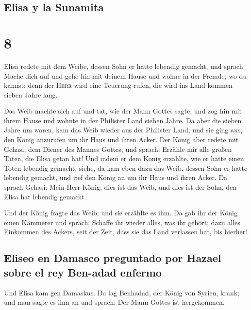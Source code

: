 \hypertarget{elisa-y-la-sunamita}{%
\subsection{Elisa y la Sunamita}\label{elisa-y-la-sunamita}}

\hypertarget{section-7}{%
\section{8}\label{section-7}}

 Elisa redete mit dem Weibe, dessen Sohn er hatte lebendig
gemacht, und sprach: Mache dich auf und gehe hin mit deinem Hause und
wohne in der Fremde, wo du kannst; denn der \textsc{Herr} wird eine
Teuerung rufen, die wird ins Land kommen sieben Jahre lang.

 Das Weib machte sich auf und tat, wie der Mann Gottes
sagte, und zog hin mit ihrem Hause und wohnte in der Philister Land
sieben Jahre.  Da aber die sieben Jahre um waren, kam das
Weib wieder aus der Philister Land; und sie ging aus, den König
anzurufen um ihr Haus und ihren Acker.  Der König aber
redete mit Gehasi, dem Diener des Mannes Gottes, und sprach: Erzähle mir
alle großen Taten, die Elisa getan hat!  Und indem er dem
König erzählte, wie er hätte einen Toten lebendig gemacht, siehe, da kam
eben dazu das Weib, dessen Sohn er hatte lebendig gemacht, und rief den
König an um ihr Haus und ihren Acker. Da sprach Gehasi: Mein Herr König,
dies ist das Weib, und dies ist der Sohn, den Elisa hat lebendig
gemacht.

 Und der König fragte das Weib; und sie erzählte es ihm.
Da gab ihr der König einen Kämmerer und sprach: Schaffe ihr wieder
alles, was ihr gehört; dazu alles Einkommen des Ackers, seit der Zeit,
dass sie das Land verlassen hat, bis hierher!

\hypertarget{eliseo-en-damasco-preguntado-por-hazael-sobre-el-rey-ben-adad-enfermo}{%
\subsection{Eliseo en Damasco preguntado por Hazael sobre el rey
Ben-adad
enfermo}\label{eliseo-en-damasco-preguntado-por-hazael-sobre-el-rey-ben-adad-enfermo}}

 Und Elisa kam gen Damaskus. Da lag Benhadad, der König
von Syrien, krank; und man sagte es ihm an und sprach: Der Mann Gottes
ist hergekommen.

